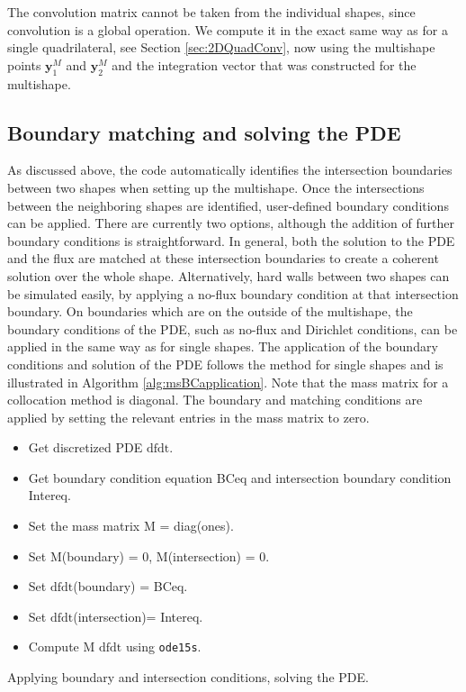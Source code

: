 The convolution matrix cannot be taken from the individual shapes, since convolution is a global operation. We compute it in the exact same way as for a single quadrilateral, see Section \ref{sec:2DQuadConv}, now using the multishape points $\mathbf{y}_1^M$ and $\mathbf{y}_2^M$ and the integration vector that was constructed for the multishape.



\subsection{Boundary matching and solving the PDE}
As discussed above, the code automatically identifies the intersection boundaries between two shapes when setting up the multishape. Once the intersections between the neighboring shapes are identified, user-defined boundary conditions can be applied. There are currently two options, although the addition of further boundary conditions is straightforward. In general, both the solution to the PDE and the flux are matched at these intersection boundaries to create a coherent solution over the whole shape. Alternatively, hard walls between two shapes can be simulated easily, by applying a no-flux boundary condition at that intersection boundary. On boundaries which are on the outside of the multishape, the boundary conditions of the PDE, such as no-flux and Dirichlet conditions, can be applied in the same way as for single shapes.
The application of the boundary conditions and solution of the PDE follows the method for single shapes and is illustrated in Algorithm \ref{alg:msBCapplication}. Note that the mass matrix for a collocation method is diagonal. The boundary and matching conditions are applied by setting the relevant entries in the mass matrix to zero.
\\
	\begin{algorithm}[H]
		\SetAlgoLined
		\begin{itemize}
			\item Get discretized PDE $\text{dfdt}$.
			\item Get boundary condition equation BCeq and intersection boundary condition Intereq.
			\item Set the mass matrix M = diag(ones).
			\item Set M(boundary) = 0,  M(intersection) = 0.
			\item Set $\text{dfdt}$(boundary) = BCeq.
			\item Set $\text{dfdt}$(intersection)= Intereq.
			\item Compute M $\text{dfdt}$ using \texttt{ode15s}.
		\end{itemize}
		
		\caption{Applying boundary and intersection conditions, solving the PDE.}
		\label{alg:msBCapplication}
	\end{algorithm}
	
%	
%	
	
%
